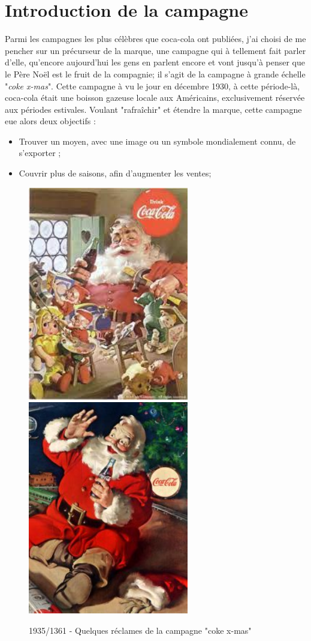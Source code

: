 

\section{Introduction de la campagne }

Parmi les campagnes les plus célèbres que coca-cola ont publiées, j'ai choisi de me pencher sur un précurseur de la marque, une campagne qui à tellement fait parler d'elle, qu'encore aujourd'hui les gens en parlent encore et vont jusqu'à penser que le Père Noël est le fruit de la compagnie;  il s'agit de la campagne à grande échelle "\textit{coke x-mas}".
Cette campagne à vu le jour en décembre 1930, à cette période-là, coca-cola était une boisson gazeuse locale aux Américains, exclusivement réservée aux périodes estivales.
Voulant "rafraîchir" et étendre la marque, cette campagne eue alors deux objectifs : 

\begin{itemize}
\item Trouver un moyen, avec une image ou un symbole mondialement connu, de s'exporter ;
\item Couvrir plus de saisons, afin d'augmenter les ventes;
\end{itemize}

\begin{figure}[th]
\centering
\includegraphics[width=70mm]{medias/perenoel1}
\includegraphics[width=70mm]{medias/perenoel2}
\decoRule
\caption{1935/1361 - Quelques réclames de la campagne "coke x-mas"}
\end{figure}
